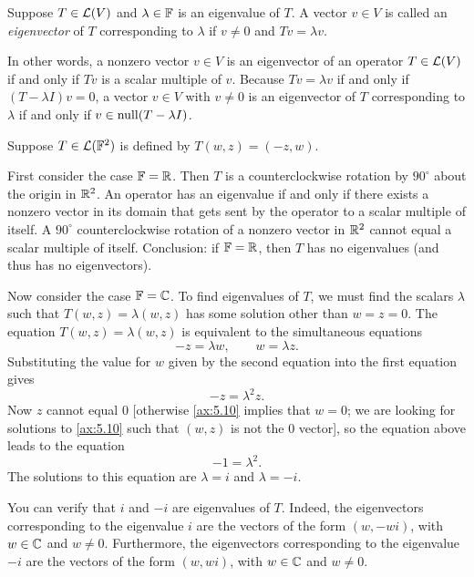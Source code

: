 \begin{definition}[Eigenvector]\label{ax:5.8}
Suppose $T\in\mathcal{L}(V)$ and $\lambda\in\mathbb{F}$ is an eigenvalue of $T$. A vector
$v\in V$ is called an \emph{eigenvector} of $T$ corresponding to $\lambda$ if
$v\ne0$ and $Tv=\lambda v$.
\end{definition}

In other words, a nonzero vector $v\in V$ is an eigenvector of an operator
$T\in\mathcal{L}(V)$ if and only if $Tv$ is a scalar multiple of $v$. Because
$Tv=\lambda v$ if and only if $(T-\lambda I)v=0$, a vector $v\in V$ with
$v\ne0$ is an eigenvector of $T$ corresponding to $\lambda$ if and only if
$v\in\operatorname{null}(T-\lambda I)$.

\begin{example}\label{ax:5.9}
Suppose $T\in\mathcal{L}(\mathbb{F}^2)$ is defined by $T(w,z)=(-z,w)$.
\begin{parts}
\item First consider the case $\mathbb{F}=\mathbb{R}$. Then $T$ is a counterclockwise rotation
  by $90^\circ$ about the origin in $\mathbb{R}^2$. An operator has an eigenvalue if and
  only if there exists a nonzero vector in its domain that gets sent by the
  operator to a scalar multiple of itself. A $90^\circ$ counterclockwise
  rotation of a nonzero vector in $\mathbb{R}^2$ cannot equal a scalar multiple of
  itself. Conclusion: if $\mathbb{F}=\mathbb{R}$, then $T$ has no eigenvalues (and thus has no
  eigenvectors).
\item Now consider the case $\mathbb{F}=\mathbb{C}$. To find eigenvalues of $T$, we must find
  the scalars $\lambda$ such that $T(w,z)=\lambda(w,z)$ has some solution other
  than $w=z=0$. The equation $T(w,z)=\lambda(w,z)$ is equivalent to the
  simultaneous equations%
  \[ -z=\lambda w,\qquad w=\lambda z. \tag*{\thetheorem}\label{ax:5.10} \]
  Substituting the value for $w$ given by the second equation into the first
  equation gives
  \[ -z = \lambda^2 z. \]
  Now $z$ cannot equal $0$ [otherwise \ref{ax:5.10} implies that $w=0$; we are
  looking for solutions to \ref{ax:5.10} such that $(w,z)$ is not the $0$
  vector], so the equation above leads to the equation
  \[ -1 = \lambda^2. \]
  The solutions to this equation are $\lambda=i$ and $\lambda=-i$.

  You can verify that $i$ and $-i$ are eigenvalues of $T$. Indeed, the
  eigenvectors corresponding to the eigenvalue $i$ are the vectors of the form
  $(w,-wi)$, with $w\in\mathbb{C}$ and $w\ne0$. Furthermore, the eigenvectors
  corresponding to the eigenvalue $-i$ are the vectors of the form $(w,wi)$,
  with $w\in\mathbb{C}$ and $w\ne0$.
\end{parts}
\end{example}

